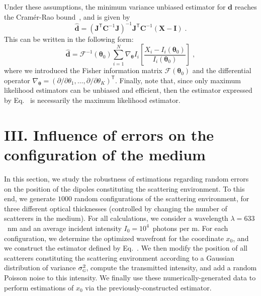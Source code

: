 \documentclass[aps,prl,twocolumn,amsmath,amssymb,superscriptaddress,10pt,nobibnotes]{revtex4-2}
\makeatletter
\renewcommand{\eqref}[1]{\textup{\tagform@{\ref*{#1}}}}
\renewcommand{\bm}[1]{\boldsymbol{\mathbf{#1}}}
\newcommand{\eq}[1]{Eq.~\eqref{#1}}
\makeatother
\begin{document}
Under these assumptions, the minimum variance unbiased estimator for $\bm{d}$ reaches the Cramér-Rao bound~\cite{kay_fundamentals_1993_2}, and is given by
\begin{equation}
\hat{\bm{d}} = \left( \bm{J}^\mathsf{T} \bm{C}^{-1} \bm{J} \right)^{-1} \bm{J}^\mathsf{T} \bm{C}^{-1} \left( \bm{X}- \bm{I} \right) \; .
\end{equation}
This can be written in the following form:
\begin{equation}
\hat{\bm{d}} = \bm{\mathcal{F}}^{-1} (\bm{\theta}_0) \sum_{i=1}^{N} \nabla_{\bm{\theta}} I_i \left[ \frac{X_i - I_i (\bm{\theta}_0) }{I_i (\bm{\theta}_0) } \right] \; ,
\label{eq_estimator}
\end{equation}
where we introduced the Fisher information matrix $ \bm{\mathcal{F}}(\bm{\theta}_0)$ and the differential operator $\nabla_{\bm{\theta}} = (\partial/\partial \theta_1, \dots, \partial/\partial \theta_K)^\mathsf{T}$. Finally, note that, since only maximum likelihood estimators can be unbiased and efficient, then the estimator expressed by \eq{eq_estimator} is necessarily the maximum likelihood estimator. 

\section{III. Influence of errors on the configuration of the medium}



In this section, we study the robustness of estimations regarding random errors on the position of the dipoles constituting the scattering environment. To this end, we generate $1000$ random configurations of the scattering environment, for three different optical thicknesses (controlled by changing the number of scatterers in the medium). For all calculations, we consider a wavelength $\lambda=633$~nm and an average incident intensity $I_0=10^4$~photons per \textmu m. For each configuration, we determine the optimized wavefront for the coordinate $x_0$, and we construct the estimator defined by \eq{eq_estimator}. We then modify the position of all scatterers constituting the scattering environment according to a Gaussian distribution of variance $\sigma_\textsc{g}^2$, compute the transmitted intensity, and add a random Poisson noise to this intensity. We finally use these numerically-generated data to perform estimations of $x_0$ via the previously-constructed estimator.
\end{document}
